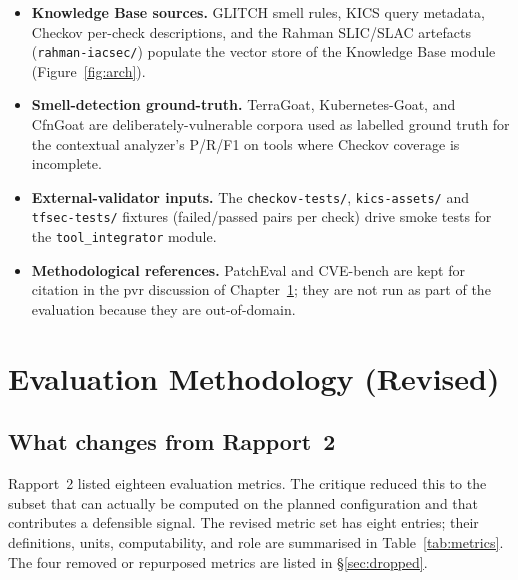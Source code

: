 \documentclass[12pt, a4paper]{report}
\begin{document}
\begin{itemize}
  \item \textbf{Knowledge Base sources.} GLITCH smell rules,
        KICS query metadata, Checkov per-check descriptions, and the
        Rahman SLIC/SLAC artefacts (\texttt{rahman-iacsec/}) populate
        the vector store of the Knowledge Base module
        (Figure~\ref{fig:arch}).
  \item \textbf{Smell-detection ground-truth.} TerraGoat,
        Kubernetes-Goat, and CfnGoat are deliberately-vulnerable corpora
        used as labelled ground truth for the contextual analyzer's P/R/F1
        on tools where Checkov coverage is incomplete.
  \item \textbf{External-validator inputs.} The
        \texttt{checkov-tests/}, \texttt{kics-assets/} and
        \texttt{tfsec-tests/} fixtures (failed/passed pairs per check)
        drive smoke tests for the \texttt{tool\_integrator} module.
  \item \textbf{Methodological references.} PatchEval and CVE-bench are
        kept for citation in the \gls{pvr} discussion of
        Chapter~\ref{chap:eval}; they are not run as part of the
        evaluation because they are out-of-domain.
\end{itemize}

\chapter{Evaluation Methodology (Revised)}
\label{chap:eval}

\section{What changes from Rapport~2}

Rapport~2 listed eighteen evaluation metrics. The critique reduced this to
the subset that can actually be computed on the planned configuration and
that contributes a defensible signal. The revised metric set has eight
entries; their definitions, units, computability, and role are summarised
in Table~\ref{tab:metrics}. The four removed or repurposed metrics are
listed in \S\ref{sec:dropped}.
\end{document}
